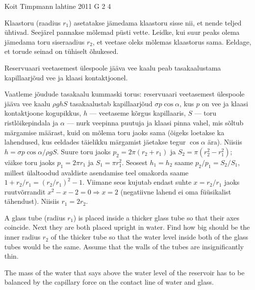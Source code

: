 {Koit Timpmann} %
{lahtine} %
{2011} %
{G 2} %
{4} %
{
\ifStatement
Klaastoru (raadius $r_1$) asetatakse jämedama klaastoru sisse nii, et nende teljed ühtivad. Seejärel
pannakse mõlemad püsti vette. Leidke, kui suur peaks olema jämedama toru
siseraadius $r_2$, et veetase oleks mõlemas klaastorus sama. Eeldage, et torude
seinad on tühiselt õhukesed.
\fi


\ifHint
Reservuaari veetasemest ülespoole jääva vee kaalu peab tasakaalustama kapillaarjõud vee ja klaasi kontaktjoonel.
\fi


\ifSolution
Vaatleme jõudude tasakaalu kummaski torus: reservuaari veetasemest
ülespoole jääva vee kaalu $\rho g h S$ tasakaalustab kapillaarjõud
$\sigma p \cos\alpha$, kus $p$ on vee ja klaasi kontaktjoone kogupikkus,
$h$ --- veetaseme kõrgus kapillaaris, $S$ --- toru ristlõikepindala ja
$\alpha$ --- nurk veepinna puutuja ja klaasi pinna vahel, mis sõltub
märgamise määrast, kuid on mõlema toru jaoks sama (õigeks loetakse ka lahendused, 
kus eeldades täielikku märgamist jäetakse tegur $\cos\alpha$ ära). Niisiis $h=\sigma p
\cos\alpha/\rho g S$. Suure toru jaoks $p_2=2\pi (r_2+r_1)$ ja
$S_2=\pi(r_2^2-r_1^2)$; väikse toru jaoks $p_1=2\pi r_1$ ja $S_1=\pi
r_1^2$. Seosest $h_1=h_2$ saame $p_2/p_1=S_2/S_1$, millest ülaltoodud
avaldiste asendamise teel omakorda saame
$1+r_2/r_1=(r_2/r_1)^2-1$. Viimane seos kujutab endast suhte $x=r_2/r_1$
jaoks ruutvõrrandit $x^2-x-2=0 \Rightarrow x=2$ (negatiivne lahend ei
oma füüsikalist tähendust). Niisiis $r_1=2 r_2$.
\fi


\ifEngStatement
A glass tube (radius $r_1$) is placed inside a thicker glass tube so that their axes coincide. Next they are both placed upright in water. Find how big should be the inner radius $r_2$ of the thicker tube so that the water level inside both of the glass tubes would be the same. Assume that the walls of the tubes are insignificantly thin.
\fi


\ifEngHint
The mass of the water that says above the water level of the reservoir has to be balanced by the capillary force on the contact line of water and glass.
\fi


}
